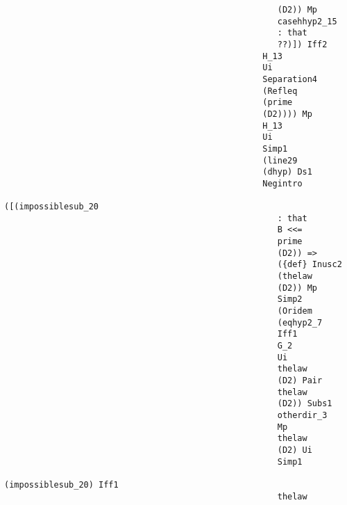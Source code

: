 \documentclass[12pt]{article}
\begin{document}
\begin{verbatim}
                                                       (D2)) Mp 
                                                       casehhyp2_15 
                                                       : that 
                                                       ??)]) Iff2 
                                                    H_13 
                                                    Ui 
                                                    Separation4 
                                                    (Refleq 
                                                    (prime 
                                                    (D2)))) Mp 
                                                    H_13 
                                                    Ui 
                                                    Simp1 
                                                    (line29 
                                                    (dhyp) Ds1 
                                                    Negintro 
                                                    ([(impossiblesub_20 
                                                       : that 
                                                       B <<= 
                                                       prime 
                                                       (D2)) => 
                                                       ({def} Inusc2 
                                                       (thelaw 
                                                       (D2)) Mp 
                                                       Simp2 
                                                       (Oridem 
                                                       (eqhyp2_7 
                                                       Iff1 
                                                       G_2 
                                                       Ui 
                                                       thelaw 
                                                       (D2) Pair 
                                                       thelaw 
                                                       (D2)) Subs1 
                                                       otherdir_3 
                                                       Mp 
                                                       thelaw 
                                                       (D2) Ui 
                                                       Simp1 
                                                       (impossiblesub_20) Iff1 
                                                       thelaw 

\end{verbatim}
\end{document}

